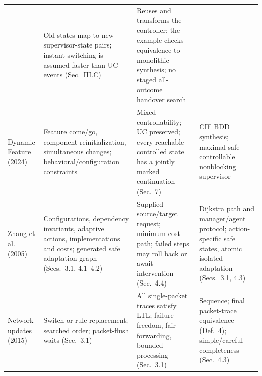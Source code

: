 \documentclass[11pt]{article}
\begin{document}
\begin{table}[!htbp]
\begin{tabular}{@{}>{\raggedright\arraybackslash}p{.15\linewidth}>{\raggedright\arraybackslash}p{.28\linewidth}>{\raggedright\arraybackslash}p{.29\linewidth}>{\raggedright\arraybackslash}p{.23\linewidth}@{}}
& Old states map to new supervisor-state pairs; instant switching is assumed faster than UC events (Sec.~III.C)
& Reuses and transforms the controller; the example checks equivalence to monolithic synthesis; no staged all-outcome handover search\\
Dynamic Feature (2024)
& Feature come/go, component reinitialization, simultaneous changes; behavioral/configuration constraints
& Mixed controllability; UC preserved; every reachable controlled state has a jointly marked continuation (Sec.~7)
& CIF BDD synthesis; maximal safe controllable nonblocking supervisor\\
\href{main.pdf#cite.Zhang2005SafeAdaptation}{Zhang et al. (2005)}
& Configurations, dependency invariants, adaptive actions, implementations and costs; generated safe adaptation graph (Secs.~3.1, 4.1--4.2)
& Supplied source/target request; minimum-cost path; failed steps may roll back or await intervention (Sec.~4.4)
& Dijkstra path and manager/agent protocol; action-specific safe states, atomic isolated adaptation (Secs.~3.1, 4.3)\\
Network updates (2015)
& Switch or rule replacement; searched order; packet-flush waits (Sec.~3.1)
& All single-packet traces satisfy LTL; failure freedom, fair forwarding, bounded processing (Sec.~3.1)
& Sequence; final packet-trace equivalence (Def.~4); simple/careful completeness (Sec.~4.3)\\
\bottomrule
\end{tabular}
\end{table}

\clearpage
\end{document}
